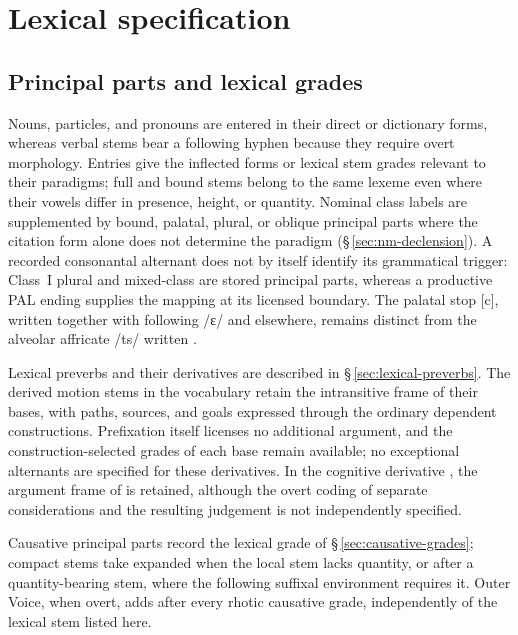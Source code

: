 \section{Lexical specification}

\subsection{Principal parts and lexical grades}\label{sec:lexical-principal-parts}

Nouns, particles, and pronouns are entered in their direct or dictionary forms,
whereas verbal stems bear a following hyphen because they require overt
morphology. Entries give the inflected forms or lexical stem grades relevant to
their paradigms; full and bound stems belong to the same lexeme even where their
vowels differ in presence, height, or quantity. Nominal class labels are supplemented by
bound, palatal, plural, or oblique principal parts where
the citation form alone does not determine the paradigm
(§\,\ref{sec:nm-declension}). A recorded consonantal alternant does not
by itself identify its grammatical trigger: Class~I plural 
and mixed-class  are stored principal
parts, whereas a productive PAL ending supplies the mapping at its licensed
boundary. The palatal stop [c], written  together with following
/ɛ/ and  elsewhere, remains distinct from the alveolar affricate
/ts/ written .

Lexical preverbs and their derivatives are described in
§\,\ref{sec:lexical-preverbs}. The derived motion stems in the vocabulary retain
the intransitive frame of their bases, with paths, sources, and goals expressed
through the ordinary dependent constructions. Prefixation itself licenses no
additional argument, and the construction-selected grades of each base remain
available; no exceptional alternants are specified for these derivatives. In the cognitive derivative
, the argument frame of  is retained, although the
overt coding of separate considerations and the resulting judgement is not
independently specified.

Causative principal parts record the lexical grade of
§\,\ref{sec:causative-grades}; compact stems take expanded  when the local stem lacks
quantity, or  after a quantity-bearing stem, where the
following suffixal environment requires it. Outer Voice, when overt,
adds  after every rhotic causative grade, independently of
the lexical stem listed here.

